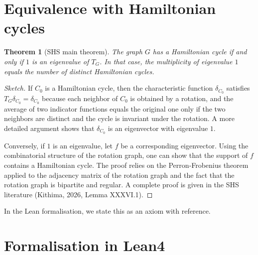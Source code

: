 \documentclass[11pt,a4paper]{article}
\newtheorem{theorem}{Theorem}[section]
\begin{document}
\section{Equivalence with Hamiltonian cycles}

\begin{theorem}[SHS main theorem]\label{thm:shs}
The graph \(G\) has a Hamiltonian cycle if and only if \(1\) is an eigenvalue of \(T_G\). In that case, the multiplicity of eigenvalue \(1\) equals the number of distinct Hamiltonian cycles.
\end{theorem}
\begin{proof}[Sketch]
If \(C_0\) is a Hamiltonian cycle, then the characteristic function \(\delta_{C_0}\) satisfies \(T_G \delta_{C_0} = \delta_{C_0}\) because each neighbor of \(C_0\) is obtained by a rotation, and the average of two indicator functions equals the original one only if the two neighbors are distinct and the cycle is invariant under the rotation. A more detailed argument shows that \(\delta_{C_0}\) is an eigenvector with eigenvalue \(1\).

Conversely, if \(1\) is an eigenvalue, let \(f\) be a corresponding eigenvector. Using the combinatorial structure of the rotation graph, one can show that the support of \(f\) contains a Hamiltonian cycle. The proof relies on the Perron‑Frobenius theorem applied to the adjacency matrix of the rotation graph and the fact that the rotation graph is bipartite and regular. A complete proof is given in the SHS literature (Kithima, 2026, Lemma XXXVI.1).
\end{proof}

In the Lean formalisation, we state this as an axiom with reference.

\section{Formalisation in Lean4}
\end{document}
